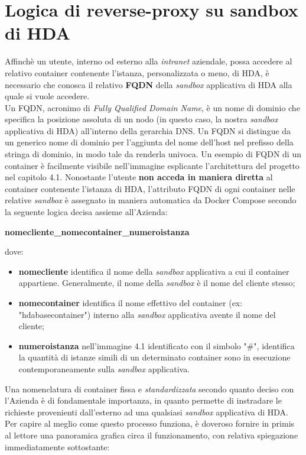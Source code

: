 \section{Logica di reverse-proxy su sandbox di HDA}
Affinchè un utente, interno od esterno alla \textit{intranet} aziendale, possa accedere al relativo container contenente l'istanza, personalizzata o meno, di HDA, è necessario che conosca il relativo \textbf{FQDN} della \textit{sandbox} applicativa di HDA alla quale si vuole accedere.\\
Un FQDN, acronimo di \textit{Fully Qualified Domain Name}, è un nome di dominio che specifica la posizione assoluta di un nodo (in questo caso, la nostra \textit{sandbox} applicativa di HDA) all'interno della gerarchia DNS. Un FQDN si distingue da un generico nome di dominio per l'aggiunta del nome dell'host nel prefisso della stringa di dominio, in modo tale da renderla univoca. Un esempio di FQDN di un container è facilmente visibile nell'immagine esplicante l'architettura del progetto nel capitolo 4.1.
Nonostante l'utente \textbf{non acceda in maniera diretta} al container contenente l'istanza di HDA, l'attributo FQDN di ogni container nelle relative \textit{sandbox} è assegnato in maniera automatica da Docker Compose secondo la seguente logica decisa assieme all'Azienda:
\centerline{\textbf{nomecliente\_nomecontainer\_numeroistanza}}
dove:
\begin{itemize}
	\item \textbf{nomecliente} identifica il nome della \textit{sandbox} applicativa a cui il container appartiene. Generalmente, il nome della \textit{sandbox} è il nome del cliente stesso;
	\item \textbf{nomecontainer} identifica il nome effettivo del container (ex: "hdabasecontainer") interno alla \textit{sandbox} applicativa avente il nome del cliente;
	\item \textbf{numeroistanza} nell'immagine 4.1 identificato con il simbolo "\#", identifica la quantità di istanze simili di un determinato container sono in esecuzione contemporaneamente sulla \textit{sandbox} applicativa.
\end{itemize}
Una nomenclatura di container fissa e \textit{standardizzata} secondo quanto deciso con l'Azienda è di fondamentale importanza, in quanto permette di instradare le richieste provenienti dall'esterno ad una qualsiasi \textit{sandbox} applicativa di HDA.
Per capire al meglio come questo processo funziona, è doveroso fornire in primis al lettore una panoramica grafica circa il funzionamento, con relativa spiegazione immediatamente sottostante:
